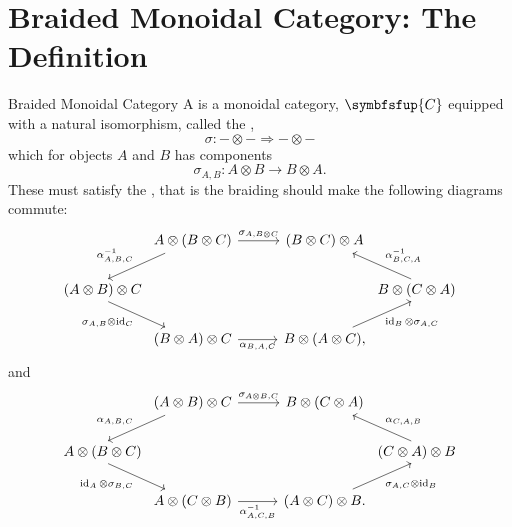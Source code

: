 \documentclass[fleqn]{NotesClass}
\newcommand{\cat}[1]{\symbfsfup{#1}}
\DeclareMathOperator{\id}{id}
\newcommand{\naturalTransformation}{\Rightarrow}
\begin{document}
    \section{Braided Monoidal Category: The Definition}
    \begin{dfn}{Braided Monoidal Category}{}
        A  is a monoidal category, \(\cat{C}\) equipped with a natural isomorphism, called the ,
        \begin{equation}
            \sigma \colon -\otimes- \naturalTransformation -\otimes-
        \end{equation}
        which for objects \(A\) and \(B\) has components
        \begin{equation}
            \sigma_{A,B} \colon A \otimes B \to B \otimes A.
        \end{equation}
        These must satisfy the , that is the braiding should make the following diagrams commute:
        \begin{equation}
            \begin{tikzcd}[column sep=1cm]
                & A \otimes (B \otimes C) \arrow[r, "\sigma_{A,B\otimes C}"] \arrow[dl, "\alpha_{A,B,C}^{-1}"'] & (B \otimes C) \otimes A & \\
                (A \otimes B) \otimes C \arrow[dr, "\sigma_{A,B} \otimes \id_C"'] \hspace{-1cm} &&& \hspace{-1cm} B \otimes (C \otimes A) \arrow[ul, "\alpha_{B,C,A}^{-1}"']\\
                & (B \otimes A) \otimes C \arrow[r, "\alpha_{B,A,C}"'] & B \otimes (A \otimes C), \arrow[ur, "\id_B \otimes \sigma_{A,C}"']
            \end{tikzcd}
        \end{equation}
        and
        \begin{equation}
            \begin{tikzcd}[column sep=1cm]
                & (A \otimes B) \otimes C \arrow[r, "\sigma_{A\otimes B,C}"] \arrow[dl, "\alpha_{A,B,C}"'] & B \otimes (C \otimes A) & \\
                A \otimes (B \otimes C) \arrow[dr, "\id_A \otimes \sigma_{B,C}"'] \hspace{-1cm} &&& \hspace{-1cm} (C \otimes A) \otimes B \arrow[ul, "\alpha_{C,A,B}"']\\
                & A \otimes (C \otimes B) \arrow[r, "\alpha_{A,C,B}^{-1}"'] & (A \otimes C) \otimes B. \arrow[ur, "\sigma_{A,C} \otimes \id_B"']
            \end{tikzcd}
        \end{equation}
    \end{dfn}
    
\end{document}
